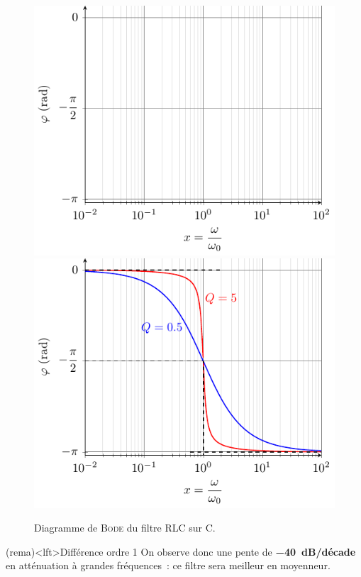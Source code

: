 \documentclass[../../main/main.tex]{subfiles}
\begin{document}
\begin{figure}[htbp!]
{{			\includegraphics[width=.95\linewidth]{RLCC_bode-phase_plain}
		}{%
			\includegraphics[width=.95\linewidth]{RLCC_bode-phase}
		}%
	}%
	\caption{Diagramme de \textsc{Bode} du filtre RLC sur C.}
	\label{fig:rlcbode}
\end{figure}

\begin{tcb}(rema)<lft>{Différence ordre 1}
	On observe donc une pente de \textbf{\SI{-40}{dB/décade}} en atténuation à
	grandes fréquences~: ce filtre sera meilleur en moyenneur.
\end{tcb}
\end{document}
